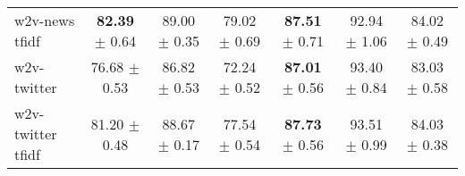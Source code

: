 \begin{tabular}{|l|ccc|ccc|}
      w2v-news tfidf &  \textbf{82.39}
                              $\pm$ 0.64 &  89.00 $\pm$ 0.35 &  79.02 $\pm$ 0.69 &  \textbf{87.51}
                                                                                          $\pm$ 0.71 &  92.94 $\pm$ 1.06 &  84.02 $\pm$ 0.49 \\
        w2v-twitter  &  76.68 $\pm$ 0.53 &  86.82 $\pm$ 0.53 &  72.24 $\pm$ 0.52 &  \textbf{87.01}
                                                                                          $\pm$ 0.56 &  93.40 $\pm$ 0.84 &  83.03 $\pm$ 0.58 \\
   w2v-twitter tfidf &  81.20 $\pm$ 0.48 &  88.67 $\pm$ 0.17 &  77.54 $\pm$ 0.54 &  \textbf{87.73}
                                                                                          $\pm$ 0.56 &  93.51 $\pm$ 0.99 &  84.03 $\pm$ 0.38 \\
\hline
\end{tabular}
